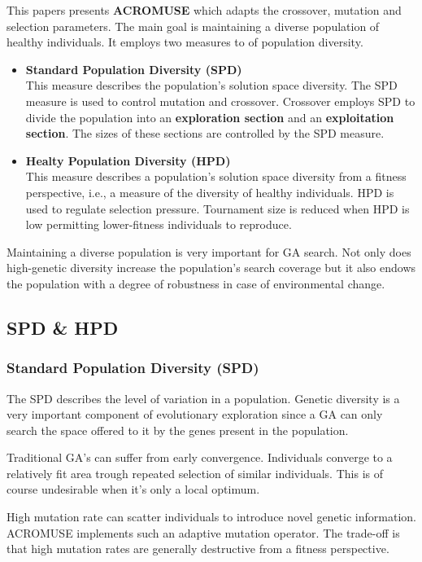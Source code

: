 \documentclass[../main.tex]{subfiles}
\begin{document}
This papers presents \textbf{ACROMUSE} which adapts the crossover, mutation and selection parameters. The main goal is
maintaining a diverse population of healthy individuals. It employs two measures to of population diversity.

\begin{itemize}
	\item \textbf{Standard Population Diversity (SPD)} \\
	This measure describes the population's solution space diversity. The SPD measure is used to control mutation and
	crossover. Crossover employs SPD to divide the population into an \textbf{exploration section} and an
	\textbf{exploitation section}. The sizes of these sections are controlled by the SPD measure.
	\item \textbf{Healty Population Diversity (HPD)} \\
	This measure describes a population’s solution space diversity from a fitness perspective, i.e., a measure of the
	diversity of healthy individuals. HPD is used to regulate selection pressure. Tournament size is reduced when HPD
	is low permitting lower-fitness individuals to reproduce.
\end{itemize}

Maintaining a diverse population is very important for GA search. Not only does high-genetic diversity increase the
population's search coverage but it also endows the population with a degree of robustness in case of environmental
change.

\subsection{SPD \& HPD}

\subsubsection{Standard Population Diversity (SPD)}
The SPD describes the level of variation in a population. Genetic diversity is a very important component of
evolutionary exploration since a GA can only search the space offered to it by the genes present in the population.

Traditional GA's can suffer from early convergence. Individuals converge to a relatively fit area trough repeated
selection of similar individuals. This is of course undesirable when it's only a local optimum.

High mutation rate can scatter individuals to introduce novel genetic information. ACROMUSE implements such an adaptive
mutation operator. The trade-off is that high mutation rates are generally destructive from a fitness perspective.
\end{document}
